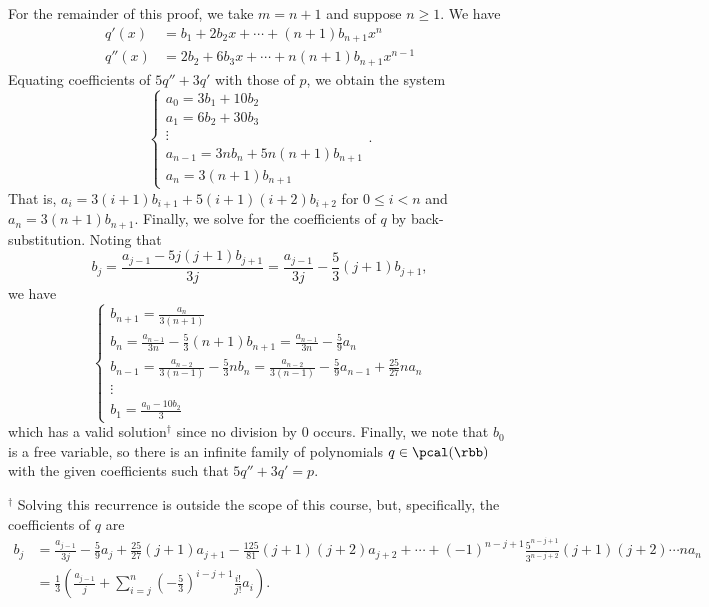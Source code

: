 \begin{coole}
    For the remainder of this proof, we take $m = n+1$ and suppose $n \geq 1$.
    We have
    \begin{align*}
        q'(x) &= b_1 + 2b_2x + \cdots + (n+1)b_{n+1}x^n \\
        q''(x) &= 2b_2 + 6b_3x + \cdots + n(n+1)b_{n+1}x^{n-1}
    \end{align*}
    Equating coefficients of $5q'' + 3q'$ with those of $p$, we obtain the system
    \[
        \begin{cases}
            a_0 = 3b_1 + 10b_2 \\
            a_1 = 6b_2 + 30b_3 \\
            \vdots \\ 
            a_{n-1} = 3nb_n + 5n(n+1)b_{n+1} \\
            a_n = 3(n+1)b_{n+1}
        \end{cases}.
    \]
    That is, $a_i = 3(i+1)b_{i+1} + 5(i+1)(i+2)b_{i+2}$ for $0 \leq i < n$ and $a_n = 3(n+1)b_{n+1}$.
    Finally, we solve for the coefficients of $q$ by back-substitution.
    Noting that
    \[
    	b_j = \frac{a_{j-1} - 5j(j+1)b_{j+1}}{3j} = \frac{a_{j-1}}{3j} - \frac{5}{3}(j+1)b_{j+1},
    \]
    we have 
    \[
        \begin{cases}
            b_{n+1} = \frac{a_n}{3(n+1)} \\
            b_n = \frac{a_{n-1}}{3n} - \frac{5}{3}(n+1)b_{n+1} = \frac{a_{n-1}}{3n} - \frac{5}{9}a_n \\
            b_{n-1} = \frac{a_{n-2}}{3(n-1)} - \frac{5}{3}nb_n = \frac{a_{n-2}}{3(n-1)} - \frac{5}{9}a_{n-1} + \frac{25}{27}na_n \\
            \vdots \\
            b_1 = \frac{a_0 - 10b_2}{3}
        \end{cases}
    \]
    which has a valid solution$^\dagger$ since no division by $0$ occurs.
    Finally, we note that $b_0$ is a free variable, so there is an infinite family of polynomials $q \in \pcal(\rbb)$ with the given coefficients such that $5q'' + 3q' = p$. 
\end{coole}
$^\dagger$ Solving this recurrence is outside the scope of this course, but, specifically, the coefficients of $q$ are 
\begin{align*}
    b_j &= \frac{a_{j-1}}{3j} - \frac{5}{9}a_j + \frac{25}{27}(j+1)a_{j+1} - \frac{125}{81}(j+1)(j+2)a_{j+2} + \cdots + (-1)^{n-j+1}\frac{5^{n-j+1}}{3^{n-j+2}}(j+1)(j+2)\cdots na_n \\
    &= \frac{1}{3}\left(\frac{a_{j-1}}{j} + \sum_{i=j}^n\left(-\frac{5}{3}\right)^{i-j+1}\frac{i!}{j!}a_{i}\right).
\end{align*}


